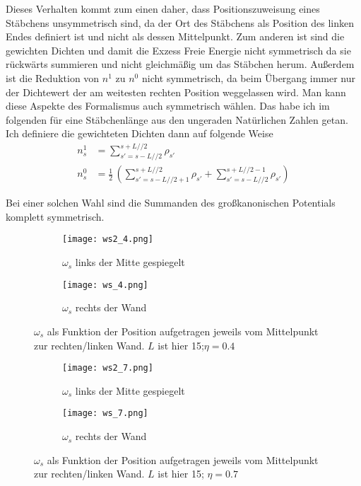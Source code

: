 \documentclass[12pt]{article}
\begin{document}
Dieses Verhalten kommt zum einen daher, dass Positionszuweisung eines Stäbchens unsymmetrisch sind, da der Ort des Stäbchens als Position des linken Endes definiert ist und nicht als dessen Mittelpunkt. Zum anderen ist sind die gewichten Dichten und damit die Exzess Freie Energie nicht symmetrisch da sie rückwärts summieren und nicht gleichmäßig um das Stäbchen herum. Außerdem ist die Reduktion von $n^1$ zu $n^0$ nicht symmetrisch, da beim Übergang immer nur der Dichtewert der am weitesten rechten Position weggelassen wird. Man kann diese Aspekte des Formalismus auch symmetrisch wählen. Das habe ich im folgenden für eine Stäbchenlänge aus den ungeraden Natürlichen Zahlen getan. Ich definiere die gewichteten Dichten dann auf folgende Weise
\begin{align*}n^1_s&=\sum_{s'=s-L//2}^{s+L//2}\rho_{s'}\\
n^0_s&=\frac{1}{2}\,\left(\sum_{s'=s-L//2+1}^{s+L//2}\rho_{s'}+\sum_{s'=s-L//2}^{s+L//2-1}\rho_{s'}\right)\end{align*}

Bei einer solchen Wahl sind die Summanden des großkanonischen Potentials komplett symmetrisch.

\begin{figure}[H]\hspace*{-1.5cm}
\begin{subfigure}{0.4\textwidth}
\texttt{[image: ws2\_4.png]}
\caption{$\omega_s$ links der Mitte gespiegelt}
\end{subfigure}
\hfill
\begin{subfigure}{0.4\textwidth}
\hspace*{-0.8cm}
\texttt{[image: ws\_4.png]}
\caption{$\omega_s$ rechts der Wand}
\end{subfigure}
\hfill
\caption{$\omega_s$ als Funktion der Position aufgetragen jeweils vom Mittelpunkt zur rechten/linken Wand. $L$ ist hier 15;$ \eta=0.4$}
\end{figure}


\begin{figure}[H]\hspace*{-1.5cm}
\begin{subfigure}{0.4\textwidth}
\texttt{[image: ws2\_7.png]}
\caption{$\omega_s$ links der Mitte gespiegelt}
\end{subfigure}
\hfill
\begin{subfigure}{0.4\textwidth}
\hspace*{-0.8cm}
\texttt{[image: ws\_7.png]}
\caption{$\omega_s$ rechts der Wand}
\end{subfigure}
\hfill
\caption{$\omega_s$ als Funktion der Position aufgetragen jeweils vom Mittelpunkt zur rechten/linken Wand. $L$ ist hier 15; $\eta=0.7$}
\end{figure}
\end{document}
